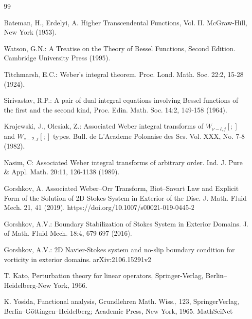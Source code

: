 \documentclass[manuscript, printscheme]{paper}
\begin{document}
\begin{thebibliography}{99}

 Bateman, H.,  Erdelyi, A. Higher Transcendental Functions, Vol. II. McGraw-Hill, New York (1953).

 Watson, G.N.: A Treatise on the Theory of Bessel Functions, Second Edition. Cambridge University Press (1995).

 Titchmarsh, E.C.: Weber's integral theorem. Proc. Lond. Math. Soc. 22:2, 15-28 (1924).

Sirivastav, R.P.: A pair of dual integral equations involving Bessel functions
of the first and the second kind, Proc. Edin. Math. Soc. 14:2, 149-158 (1964).

Krajewski, J., Olesiak, Z.: Associated Weber integral transforms of
$W_{\nu-l,j}[;]$ and $W_{\nu-2,j}[;]$ types. Bull. de L'Academe Polonaise des Scs. Vol.
XXX, No. 7-8 (1982).

 Nasim, C: Associated Weber integral transforms of arbitrary order. Ind. J. Pure \& Appl. Math. 20:11, 126-1138 (1989).

 Gorshkov, A. Associated Weber–Orr Transform, Biot–Savart Law and Explicit Form of the Solution of 2D Stokes System in Exterior of the Disc. J. Math. Fluid Mech. 21, 41 (2019). https://doi.org/10.1007/s00021-019-0445-2

 Gorshkov, A.V.: Boundary Stabilization of Stokes System in Exterior Domains. J. of Math. Fluid Mech. 18:4, 679-697 (2016).

 Gorshkov, A.V.: 2D Navier-Stokes system and no-slip boundary condition for vorticity in exterior domains. arXiv:2106.15291v2

 T. Kato, Perturbation theory for linear operators, Springer-Verlag, Berlin–Heidelberg-New York, 1966.

K. Yosida, Functional analysis, Grundlehren Math. Wiss., 123, SpringerVerlag, Berlin–Göttingen–Heidelberg; Academic Press, New York, 1965.
MathSciNet


\end{thebibliography} 
\end{document}

